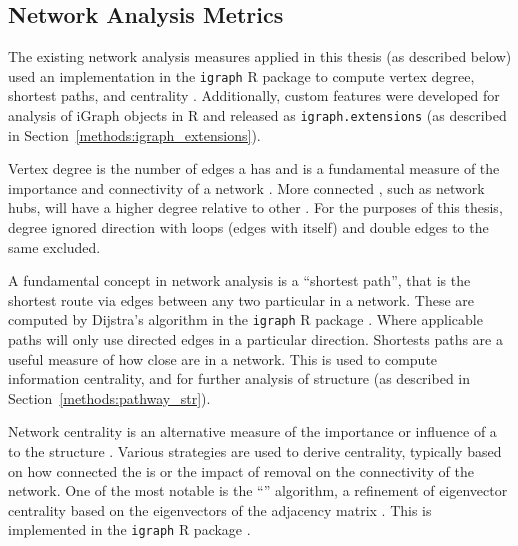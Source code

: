 \subsection{Network Analysis Metrics} \label{methods:network_metrics}
The existing network analysis measures applied in this thesis (as described below) used an implementation in the \texttt{igraph} R package to compute vertex degree, shortest paths, and centrality \citep{igraph}. Additionally, custom features were developed for analysis of iGraph objects in R and released as \texttt{igraph.extensions} (as described in Section~\ref{methods:igraph_extensions}).

Vertex degree is the number of \glspl{edge} a  has and is a fundamental measure of the importance and connectivity of a network \citep{vanSteen2010}. More connected , such as network hubs, will have a higher  degree relative to other . For the purposes of this thesis,  degree ignored  direction with loops (edges with itself) and double \glspl{edge} to the same  excluded.

A fundamental concept in network analysis is a ``\gls{shortest path}'', that is the shortest route via \glspl{edge} between any two particular  in a network. These are computed by Dijstra's algorithm \citep{Dijkstra1959} in the \texttt{igraph} R package \citep{igraph}. Where applicable paths will only use directed \glspl{edge} in a particular direction. Shortests paths are a useful measure of how close  are in a network. This is used to compute \gls{information centrality}, and for further analysis of  structure (as described in Section~\ref{methods:pathway_str}).

Network \gls{centrality} is an alternative measure of the importance or influence of a  to the  structure \citep{Borgatti2005}. Various strategies are used to derive centrality,  typically based on how connected the  is or the impact of  removal on the connectivity of the network. One of the most notable is the ``'' algorithm, a refinement of eigenvector \gls{centrality} based on the eigenvectors of the adjacency matrix \citep{Brin1998}. This is implemented in the \texttt{igraph} R package \citep{igraph}.

